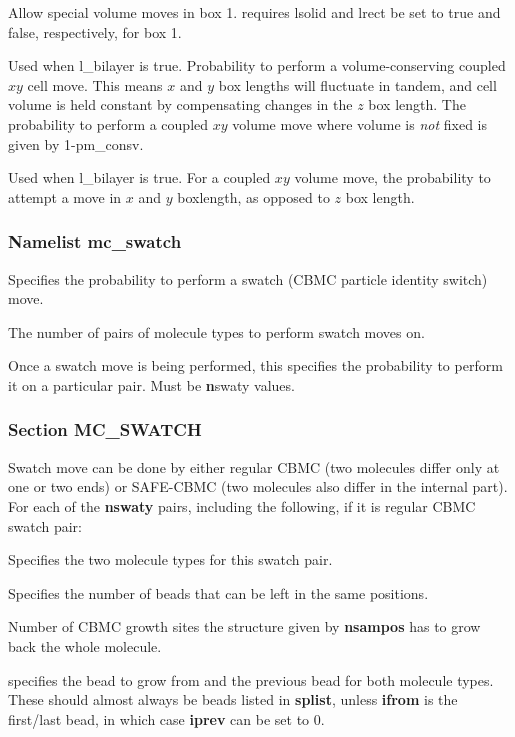 \documentclass[12pt,letterpaper]{article}
\begin{document}
 Allow special volume moves in box 1.
requires lsolid and lrect be set to true and false, respectively,
for box 1. 

 Used when l\_bilayer is true.
Probability to perform a volume-conserving
coupled $xy$ cell move. This means $x$ and $y$ box lengths will fluctuate in 
tandem, and cell volume is held constant by compensating changes in 
the $z$ box length. The probability to perform a coupled $xy$ volume move
where volume is \textit{not} fixed is given by 1-pm\_consv.

  Used when l\_bilayer is true. 
For a coupled $xy$ volume move, the probability to attempt a move in $x$ and $y$ boxlength,
as opposed to $z$ box length. 

\subsubsection{Namelist \textbf{mc\_swatch}}
 Specifies the probability to perform
a swatch (CBMC particle identity switch) move.

 The number of pairs of molecule types
to perform swatch moves on.

 Once a swatch move is being
performed, this specifies the probability to perform it on a
particular pair. Must be {\textbf nswaty} values.

\subsubsection{Section \textbf{MC\_SWATCH}}
Swatch move can be done by either regular CBMC (two molecules 
differ only at one or two ends) or SAFE-CBMC (two molecules 
also differ in the internal part). For each of the \textbf{nswaty} 
pairs, including the following, if it is regular CBMC swatch pair:

 Specifies the two molecule types for this swatch pair.

 Specifies the number of beads that
can be left in the same positions.

 Number of CBMC growth sites the
structure given by {\bf nsampos} has to grow back the whole
molecule.

 specifies the bead
to grow from and the previous bead for both molecule types.
These should almost always be beads listed in {\bf splist},
unless {\bf ifrom} is the first/last bead, in which case
{\bf iprev} can be set to 0.
\end{document}
